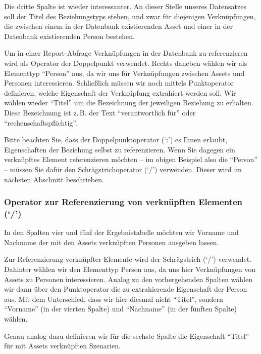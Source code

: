 \documentclass[a4paper,10pt]{book}
\newcommand{\zB}{\mbox{z.\,B.}\xspace}
\begin{document}
Die dritte Spalte ist wieder interessanter. An dieser Stelle unseres Datensatzes
soll der Titel des Beziehungstyps stehen, und zwar für diejenigen Verknüpfungen,
die zwischen einem in der Datenbank existierenden Asset und einer in der
Datenbank existierenden Person bestehen.

Um in einer Report-Abfrage Verknüpfungen in der Datenbank zu referenzieren wird
als Operator der Doppelpunkt verwendet. Rechts daneben wählen wir als Elementtyp
``Person'' aus, da wir uns für Verknüpfungen zwischen Assets und Personen
interessieren. Schließlich müssen wir noch mittels Punktoperator definieren,
welche Eigenschaft der Verknüpfung extrahiert werden soll. Wir wählen wieder
``Titel'' um die Bezeichnung der jeweiligen Beziehung zu erhalten. Diese
Bezeichnung ist \zB der Text ``verantwortlich für'' oder
``rechenschaftspflichtig''.

Bitte beachten Sie, dass der Doppelpunktoperator (`:') es Ihnen erlaubt,
Eigenschaften der Beziehung selbst zu referenzieren. Wenn Sie dagegen ein
verknüpftes Element referenzieren möchten -- im obigen Beispiel also die
``Person'' -- müssen Sie dafür den Schrägstrichoperator (`/') verwenden. Dieser
wird im nächsten Abschnitt beschrieben.

\subsubsection{\texorpdfstring{Operator zur Referenzierung von verknüpften
Elementen
(`/')}{Operator zur Referenzierung von verknüpften Elementen (/)}}\label{operator-zur-referenzierung-von-verknuxfcpften-elementen}

In den Spalten vier und fünf der Ergebnistabelle möchten wir Vorname und
Nachname der mit den Assets verknüpften Personen ausgeben lassen.

Zur Referenzierung verknüpfter Elemente wird der Schrägstrich (`/') verwendet.
Dahinter wählen wir den Elementtyp Person aus, da uns hier Verknüpfungen von
Assets zu Personen interessieren. Analog zu den vorhergehenden Spalten wählen
wir dann über den Punktoperator die zu extrahierende Eigenschaft der Person aus.
Mit dem Unterschied, dass wir hier diesmal nicht ``Titel'', sondern ``Vorname''
(in der vierten Spalte) und ``Nachname'' (in der fünften Spalte) wählen.

Genau analog dazu definieren wir für die sechste Spalte die Eigenschaft
``Titel'' für mit Assets verknüpften Szenarien.
\end{document}
